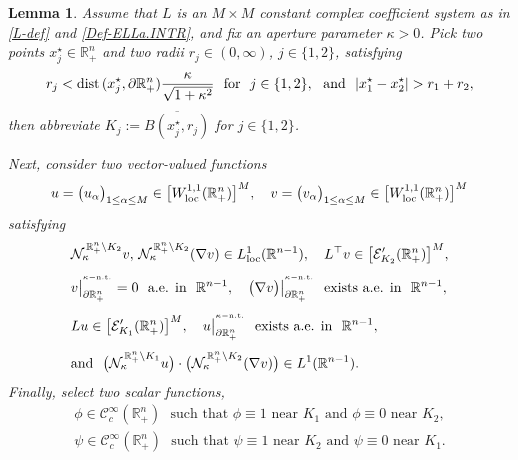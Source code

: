 \documentclass[11pt,reqno]{amsart}
\numberwithin{equation}{section}
\newtheorem{lemma}[theorem]{Lemma}
\theoremstyle{remark}
\begin{document}
\begin{lemma}\label{Lgav-TeD}
Assume that $L$ is an $M\times M$ constant complex coefficient system as in \eqref{L-def} and \eqref{Def-ELLa.INTR}, 
and fix an aperture parameter $\kappa>0$. Pick two points $x^\star_j\in{\mathbb{R}}^{n}_{+}$ 
and two radii $r_j\in(0,\infty)$, $j\in\{1,2\}$, satisfying 
%
\begin{equation}\label{CPTs}
r_j<{\rm dist}\,(x^\star_j,\partial{\mathbb{R}}^n_{+})\frac{\kappa}{\sqrt{1+\kappa^2}}
\,\,\text{ for }\,\,j\in\{1,2\},\,\,\text{ and }\,\,|x^\star_1-x^\star_2|>r_1+r_2, 
\end{equation}
%
then abbreviate $K_j:=\overline{B(x^\star_j,r_j)}$ for $j\in\{1,2\}$.

Next, consider two vector-valued functions
%
\begin{equation}\label{Tvav-TREINRv}
u=\big(u_{\alpha}\big)_{1\leq\alpha\leq M}\in\big[W^{1,1}_{\rm loc}({\mathbb{R}}^n_{+})\big]^M,\quad
v=\big(v_{\alpha}\big)_{1\leq\alpha\leq M}\in\big[W^{1,1}_{\rm loc}({\mathbb{R}}^n_{+})\big]^M
\end{equation}
%
satisfying 
%
\begin{align}\label{hBbac.1}
& {\mathcal{N}}_\kappa^{\,\mathbb{R}^{n}_{+}\setminus K_2}v,\,
{\mathcal{N}}_\kappa^{\,\mathbb{R}^{n}_{+}\setminus K_2}(\nabla v)\in L^1_{\rm loc}({\mathbb{R}}^{n-1}),\quad
L^{\top}v\in\big[{\mathcal{E}}'_{K_2}(\mathbb{R}^{n}_{+})\big]^M,
\\[4pt]
& v\big|^{{}^{\kappa-{\rm n.t.}}}_{\partial{\mathbb{R}}^n_{+}}=0
\,\,\text{ a.e. in }\,\,{\mathbb{R}}^{n-1},\quad
\big(\nabla v\big)\big|_{\partial\mathbb{R}^{n}_{+}}^{{}^{\kappa-{\rm n.t.}}}
\,\,\text{ exists a.e. in }\,\,{\mathbb{R}}^{n-1},
\label{hBbac.2}
\\[4pt]
\label{DiBBa.LLap}
& Lu\in\big[{\mathcal{E}}'_{K_1}(\mathbb{R}^{n}_{+})\big]^M,\quad
u\big|_{\partial\mathbb{R}^{n}_{+}}^{{}^{\kappa-{\rm n.t.}}}\,\,\text{ exists a.e. in }\,\,{\mathbb{R}}^{n-1},
\\[4pt]
& \text{and }\,\,
\big({\mathcal{N}}^{\,\mathbb{R}^{n}_{+}\setminus K_1}_\kappa u\big)\cdot
\big({\mathcal{N}}_\kappa^{\,\mathbb{R}^{n}_{+}\setminus K_2}(\nabla v)\big)\in L^1({\mathbb{R}}^{n-1}).
\label{DiBBa.LLap.BBBB}
\end{align}
%
Finally, select two scalar functions, 
%
\begin{equation}\label{Ua-eNBVVatGG}
\begin{array}{c}
\phi\in{\mathscr{C}}^\infty_c({\mathbb{R}}^n_{+})
\,\,\text{ such that $\phi\equiv 1$ near $K_1$ and $\phi\equiv 0$ near $K_2$},
\\[6pt]
\psi\in{\mathscr{C}}^\infty_c({\mathbb{R}}^n_{+})
\,\,\text{ such that $\psi\equiv 1$ near $K_2$ and $\psi\equiv 0$ near $K_1$}.
\end{array}
\end{equation}


\end{lemma}
\end{document}
